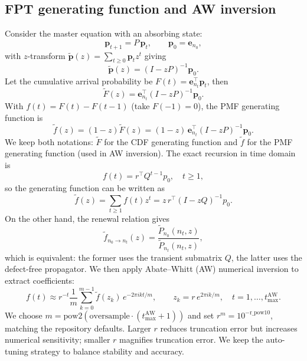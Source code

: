 \documentclass[11pt]{article}
\begin{document}
\subsection{FPT generating function and AW inversion}
Consider the master equation with an absorbing state:
\begin{equation}
  \mathbf{p}_{t+1}=P\,\mathbf{p}_t,\qquad \mathbf{p}_0=\mathbf{e}_{n_0},
\end{equation}
with $z$-transform $\tilde{\mathbf{p}}(z)=\sum_{t\ge 0}\mathbf{p}_t z^t$ giving
\begin{equation}
  \tilde{\mathbf{p}}(z)=(I-zP)^{-1}\mathbf{p}_0.
\end{equation}
Let the cumulative arrival probability be $F(t)=\mathbf{e}_{n_t}^\top \mathbf{p}_t$, then
\begin{equation}
  \tilde F(z)=\mathbf{e}_{n_t}^\top (I-zP)^{-1}\mathbf{p}_0.
\end{equation}
With $f(t)=F(t)-F(t-1)$ (take $F(-1)=0$), the PMF generating function is
\begin{equation}
  \tilde f(z)=(1-z)\tilde F(z)=(1-z)\,\mathbf{e}_{n_t}^\top (I-zP)^{-1}\mathbf{p}_0.
\end{equation}
We keep both notations: $\tilde F$ for the CDF generating function and $\tilde f$ for the PMF generating function (used in AW inversion). The exact recursion in time domain is
\begin{equation}
  f(t)=r^\top Q^{t-1} p_0,\quad t\ge 1,
  \label{eq:exact-recursion}
\end{equation}
so the generating function can be written as
\begin{equation}
  \tilde f(z)=\sum_{t\ge 1} f(t) z^t
  = z\,r^\top (I-zQ)^{-1} p_0.
\end{equation}
On the other hand, the renewal relation gives
\begin{equation}
  \tilde f_{n_0\to n_t}(z)=\frac{\tilde P_{n_0}(n_t,z)}{\tilde P_{n_t}(n_t,z)},
  \label{eq:Fz}
\end{equation}
which is equivalent: the former uses the transient submatrix $Q$, the latter uses the defect-free propagator.
We then apply Abate--Whitt (AW) numerical inversion to extract coefficients:
\begin{equation}
  f(t)\approx r^{-t}\frac{1}{m}\sum_{k=0}^{m-1}\tilde f(z_k)\,e^{-2\pi i k t/m},
  \qquad z_k=r\,e^{2\pi i k/m},\quad t=1,\dots,t_{\max}^{\mathrm{AW}}.
  \label{eq:AW}
\end{equation}
We choose $m=\mathrm{pow2}(\text{oversample}\cdot(t_{\max}^{\mathrm{AW}}+1))$ and set $r^m=10^{-\text{r\_pow10}}$, matching the repository defaults. Larger $r$ reduces truncation error but increases numerical sensitivity; smaller $r$ magnifies truncation error. We keep the auto-tuning strategy to balance stability and accuracy.
\end{document}
